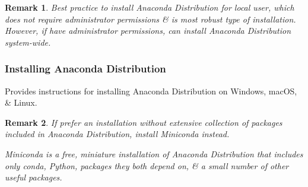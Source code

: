\documentclass{article}
\newtheorem{remark}{Remark}
\begin{document}
\begin{remark}
	Best practice to install Anaconda Distribution for local user, which does not require administrator permissions \& is most robust type of installation. However, if have administrator permissions, can install Anaconda Distribution system-wide.
\end{remark}

\subsubsection{Installing Anaconda Distribution}
Provides instructions for installing Anaconda Distribution on Windows, macOS, \& Linux.

\begin{remark}
	If prefer an installation without extensive collection of packages included in Anaconda Distribution, install Miniconda instead.
	
	Miniconda is a free, miniature installation of Anaconda Distribution that includes only conda, Python, packages they both depend on, \& a small number of other useful packages.
\end{remark}
\end{document}
